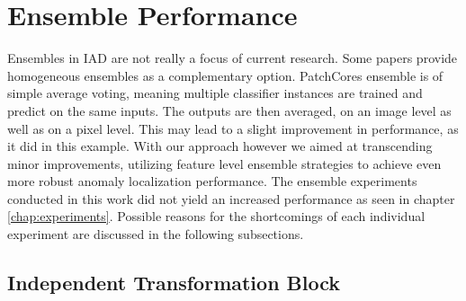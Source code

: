 \section{Ensemble Performance}
\label{sec:ensemblediscussion}

Ensembles in IAD are not really a focus of current research. Some papers \cite{patchCore2022} provide homogeneous ensembles as a complementary option. 
PatchCores ensemble is of simple average voting, meaning multiple classifier instances are trained and predict on the same inputs. The outputs are then averaged, on an image level as well as on a pixel level. 
This may lead to a slight improvement in performance, as it did in this example. 
With our approach however we aimed at transcending minor improvements, utilizing feature level ensemble strategies to achieve even more robust anomaly localization performance.
The ensemble experiments conducted in this work did not yield an increased performance as seen in chapter \ref{chap:experiments}. 
Possible reasons for the shortcomings of each individual experiment are discussed in the following subsections.

\subsection{Independent Transformation Block}
\label{subsec:ITBfaildiscussion}

